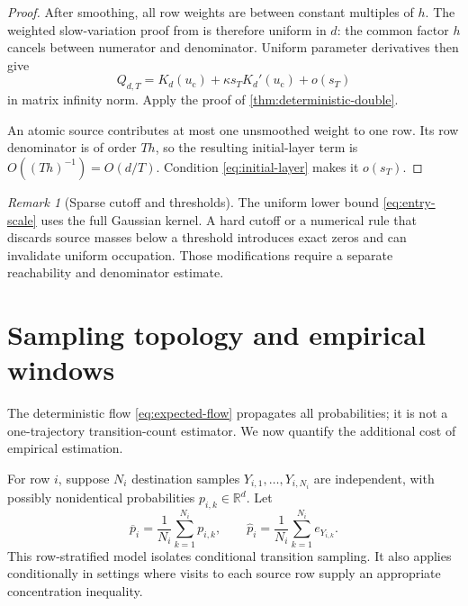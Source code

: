 \documentclass[11pt]{article}
\theoremstyle{definition}
\theoremstyle{remark}
\newtheorem{remark}[theorem]{Remark}
\newcommand{\R}{\mathbb R}
\newcommand{\uc}{u_{\mathrm c}}
\begin{document}
\begin{proof}
After smoothing, all row weights are between constant multiples of $h$.
The weighted slow-variation proof from \citet{WangGaussianResponse2026} is
therefore uniform in $d$: the common factor $h$ cancels between numerator and
denominator.  Uniform parameter derivatives then give
\[
  Q_{d,T}=K_d(\uc)+\kappa s_TK_d'(\uc)+o(s_T)
\]
in matrix infinity norm.  Apply the proof of
\cref{thm:deterministic-double}.

An atomic source contributes at most one unsmoothed weight to one row.  Its
row denominator is of order $Th$, so the resulting initial-layer term is
$O((Th)^{-1})=O(d/T)$.  Condition \eqref{eq:initial-layer} makes it
$o(s_T)$.
\end{proof}

\begin{remark}[Sparse cutoff and thresholds]\label{rem:sparse-occupation}
The uniform lower bound \eqref{eq:entry-scale} uses the full Gaussian kernel.
A hard cutoff or a numerical rule that discards source masses below a
threshold introduces exact zeros and can invalidate uniform occupation.
Those modifications require a separate reachability and denominator
estimate.
\end{remark}

\section{Sampling topology and empirical windows}
\label{sec:sampling}

The deterministic flow \eqref{eq:expected-flow} propagates all probabilities;
it is not a one-trajectory transition-count estimator.  We now quantify the
additional cost of empirical estimation.

For row $i$, suppose $N_i$ destination samples
$Y_{i,1},\ldots,Y_{i,N_i}$ are independent, with possibly nonidentical
probabilities $p_{i,k}\in\R^d$.  Let
\[
  \overline p_i=\frac1{N_i}\sum_{k=1}^{N_i}p_{i,k},\qquad
  \widehat p_i=\frac1{N_i}\sum_{k=1}^{N_i}e_{Y_{i,k}}.
\]
This row-stratified model isolates conditional transition sampling.  It also
applies conditionally in settings where visits to each source row supply an
appropriate concentration inequality.
\end{document}
